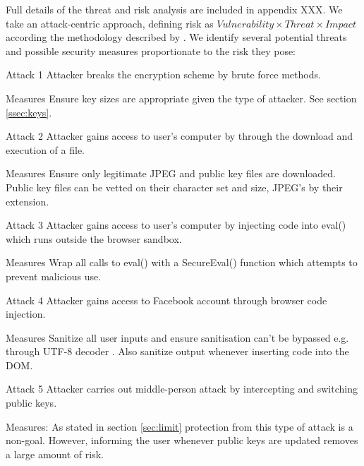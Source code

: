 Full details of the threat and risk analysis are included in appendix XXX. We take an attack-centric approach, defining risk as $Vulnerability \times Threat \times Impact$ according the methodology described by \cite{security}. We identify several potential threats and possible security measures proportionate to the risk they pose:


\begin{sdesc} \addtolength{\itemsep}{-0.5\baselineskip}
    \item[Attack 1] Attacker breaks the encryption scheme by brute force methods.
    \item[Measures] Ensure key sizes are appropriate given the type of attacker. See section \ref{ssec:keys}.
\end{sdesc}

\begin{sdesc} \addtolength{\itemsep}{-0.5\baselineskip}
    \item[Attack 2] Attacker gains access to user's computer by through the download and execution of a file.
    \item[Measures] Ensure only legitimate JPEG and public key files are downloaded. Public key files can be vetted on their character set and size, JPEG's by their extension.
\end{sdesc}

\begin{sdesc} \addtolength{\itemsep}{-0.5\baselineskip}
    \item[Attack 3] Attacker gains access to user's computer by injecting code into eval() which runs outside the browser sandbox.
    \item[Measures] Wrap all calls to eval() with a SecureEval() function which attempts to prevent malicious use. 
\end{sdesc}

\begin{sdesc} \addtolength{\itemsep}{-0.5\baselineskip}
    \item[Attack 4] Attacker gains access to Facebook account through browser code injection.
    \item[Measures] Sanitize all user inputs and ensure sanitisation can't be bypassed e.g. through UTF-8 decoder \cite{XXX}. Also sanitize output whenever inserting code into the DOM.
\end{sdesc}

\begin{sdesc}\addtolength{\itemsep}{-0.5\baselineskip}
    \item[Attack 5] Attacker carries out middle-person attack by intercepting and switching public keys.
    \item[Measures:] As stated in section \ref{sec:limit} protection from this type of attack is a non-goal. However, informing the user whenever public keys are updated removes a large amount of risk.
\end{sdesc}

